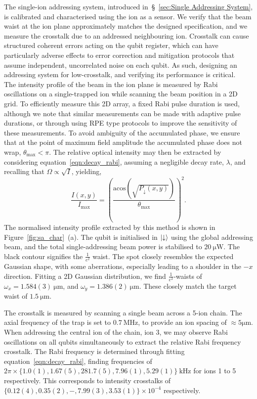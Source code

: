 The single-ion addressing system, introduced in~\S~\ref{sec:Single Addressing
System}, is calibrated and characterised using the ion as a sensor. We verify
that the beam waist at the ion plane approximately matches the designed
specification, and we measure the crosstalk due to an addressed neighbouring
ion. Crosstalk can cause structured coherent errors acting on the qubit
register, which can have particularly adverse effects to error correction and
mitigation protocols that assume independent, uncorrelated noise on each qubit.
As such, designing an addressing system for low-crosstalk, and verifying its
performance is critical.
\\

The intensity profile of the beam in the ion plane is measured by Rabi
oscillations on a single-trapped ion while scanning the beam position in a 2D
grid. To efficiently measure this 2D array, a fixed Rabi pulse duration is used,
although we note that similar measurements can be made with adaptive pulse
durations, or through using RPE type protocols to improve the sensitivity of
these measurements. To avoid ambiguity of the accumulated phase, we ensure that
at the point of maximum field amplitude the accumulated phase does not wrap,
$\theta_\mathrm{max} < \pi$.
The relative optical intensity may then be extracted by considering
equation~\ref{eqn:decay_rabi}, assuming a negligible decay rate, $\lambda$, and
recalling that $\Omega\propto\sqrt{I}$, yielding,
\begin{equation}
    \frac{I(x,y)}{I_\mathrm{max}} = \left(\frac{\mathrm{acos}\left(\sqrt{P_\downarrow(x,y)}\right)}{\theta_\mathrm{max}}\right)^2.
\end{equation}
The normalised intensity profile extracted by this method is shown in
Figure~\ref{fig:sa_char}~(a). The qubit is initialised in $\ket{\downarrow}$
using the global addressing beam, and the total single-addressing beam power is
stabilised to $20~\unit{\micro\watt}$. The black contour signifies the
$\frac{1}{e^2}$
waist. The spot closely resembles the expected Gaussian shape, with some
aberrations, especially leading to a shoulder in the $-x$ direction. Fitting a
2D Gaussian distribution, we find $\frac{1}{e^2}$-waists of
$\omega_x=1.584(3)~\unit{\micro\meter}$, and
$\omega_y=1.386(2)~\unit{\micro\meter}$. These closely match the target waist of $1.5~\unit{\micro\meter}$.

The crosstalk is measured by scanning a single beam across a 5-ion chain. The
axial frequency of the trap is set to $0.7~\unit{\mega\hertz}$, to provide an
ion spacing of $\approx 5\unit{\micro\meter}$. When addressing the central ion
of the chain, ion 3, we may observe Rabi oscillations on all qubits
simultaneously to extract the relative Rabi frequency crosstalk. The Rabi
frequency is determined through fitting equation~\ref{eqn:decay_rabi}, finding
frequencies of $2\pi\times\{1.0(1), 1.67(5), 281.7(5), 7.96(1),
5.29(1)\}~\unit{\kilo\hertz}$ for ions 1 to 5 respectively. This corresponds to
intensity crosstalks of $\{0.12(4), 0.35(2),-,7.99(3),3.53(1)\}\times10^{-4}$ respectively.


